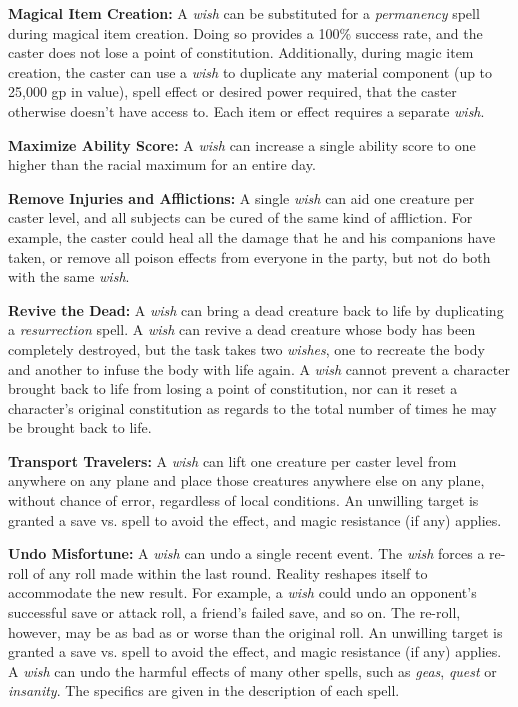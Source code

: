 \begin{multicols}{2}
\textbf{Magical Item Creation:} A \textit{wish} can be substituted for a \textit{permanency} spell during magical item creation. Doing so provides a 100\% success rate, and the caster does not lose a point of constitution.  Additionally, during magic item creation, the caster can use a \textit{wish} to duplicate any material component (up to 25,000 gp in value), spell effect or desired power required, that the caster otherwise doesn't have access to.  Each item or effect requires a separate \textit{wish}.

\textbf{Maximize Ability Score:} A \textit{wish} can increase a single ability score to one higher than the racial maximum for an entire day.
 
\textbf{Remove Injuries and Afflictions:} A single \textit{wish} can aid one creature per caster level, and all subjects can be cured of the same kind of affliction.  For example, the caster could heal all the damage that he and his companions have taken, or remove all poison effects from everyone in the party, but not do both with the same \textit{wish}. 

\textbf{Revive the Dead:} A \textit{wish} can bring a dead creature back to life by duplicating a \textit{resurrection} spell.  A \textit{wish} can revive a dead creature whose body has been completely destroyed, but the task takes two \textit{wishes}, one to recreate the body and another to infuse the body with life again.  A \textit{wish} cannot prevent a character brought back to life from losing a point of constitution, nor can it reset a character's original constitution as regards to the total number of times he may be brought back to life.

\textbf{Transport Travelers:} A \textit{wish} can lift one creature per caster level from anywhere on any plane and place those creatures anywhere else on any plane, without chance of error, regardless of local conditions.  An unwilling target is granted a save vs. spell to avoid the effect, and magic resistance (if any) applies.

\textbf{Undo Misfortune:} A \textit{wish} can undo a single recent event.  The \textit{wish} forces a re-roll of any roll made within the last round.  Reality reshapes itself to accommodate the new result.  For example, a \textit{wish} could undo an opponent's successful save or attack roll, a friend's failed save, and so on.  The re-roll, however, may be as bad as or worse than the original roll.  An unwilling target is granted a save vs. spell to avoid the effect, and magic resistance (if any) applies.  A \textit{wish} can undo the harmful effects of many other spells, such as \textit{geas}, \textit{quest} or \textit{insanity}.  The specifics are given in the description of each spell.


\end{multicols}
